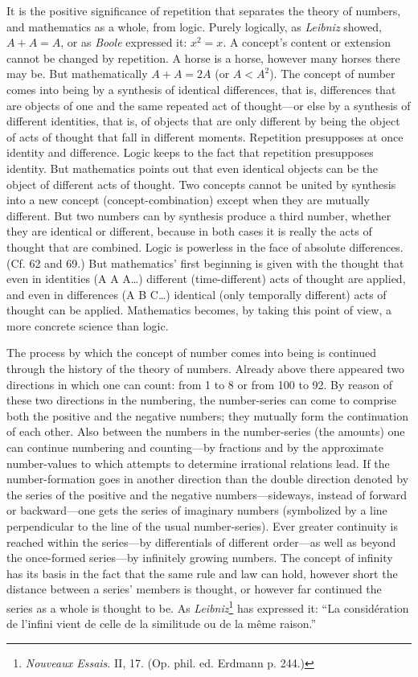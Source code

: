 \documentclass[12pt,a4paper]{book}
\newcommand{\opage}[1]{\marginnote{\footnotesize\textit{[#1]}}}
\begin{document}
It is the positive significance of repetition that separates the theory of
numbers, and mathematics as a whole, from logic. Purely logically, as
\emph{Leibniz} showed, $A + A = A$, or as \emph{Boole} expressed \opage{192}it: $x^2 =
x$. A concept's content or extension cannot be changed by repetition. A horse
is a horse, however many horses there may be. But mathematically $A + A = 2A$
(or $A < A^2$). The concept of number comes into being by a synthesis of
identical differences, that is, differences that are objects of one and the
same repeated act of thought---or else by a synthesis of different
identities, that is, of objects that are only different by being the object
of acts of thought that fall in different moments. Repetition presupposes at
once identity and difference. Logic keeps to the fact that repetition
presupposes identity. But mathematics points out that even identical objects
can be the object of different acts of thought. Two concepts cannot be united
by synthesis into a new concept (concept-combination) except when they are
mutually different. But two numbers can by synthesis produce a third number,
whether they are identical or different, because in both cases it is really
the acts of thought that are combined. Logic is powerless in the face of
absolute differences. (Cf. 62 and 69.) But mathematics' first beginning is
given with the thought that even in identities (A A A\ldots) different
(time-different) acts of thought are applied, and even in differences (A B
C\ldots) identical (only temporally different) acts of thought can be
applied. Mathematics becomes, by taking this point of view, a more concrete
science than logic.

The process by which the concept of number comes into being is continued
through the history of the theory of numbers. Already above there appeared
two directions in which one can count: from 1 to 8 or from 100 to 92. By
reason of these two directions in the numbering, the number-series can come
to comprise both the positive and the negative numbers; they mutually form
the continuation of each other. Also between the numbers in the
number-series (the amounts) one can continue numbering and counting---by
fractions and by the approximate number-values to which attempts to determine
irrational relations lead. If the number-formation goes in another direction
than the double direction denoted by the series of the positive and the
negative numbers---sideways, instead of \opage{193}forward or backward---one gets the
series of imaginary numbers (symbolized by a line perpendicular to the line
of the usual number-series). Ever greater continuity is reached within the
series---by differentials of different order---as well as beyond the
once-formed series---by infinitely growing numbers. The concept of infinity
has its basis in the fact that the same rule and law can hold, however short
the distance between a series' members is thought, or however far continued
the series as a whole is thought to be. As \emph{Leibniz}\footnote{\emph{Nouveaux
Essais}. II, 17. (Op. phil. ed. Erdmann p. 244.)} has expressed it: ``La
considération de l'infini vient de celle de la similitude ou de la même
raison.''
\end{document}
